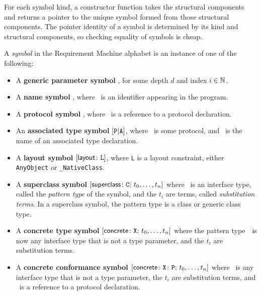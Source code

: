 \documentclass[../generics]{subfiles}
\begin{document}
For each symbol kind, a constructor function takes the structural components and returns a pointer to the unique symbol formed from those structural components. The pointer identity of a symbol is determined by its kind and structural components, so checking equality of symbols is cheap.
\begin{definition}\label{rqm symbol def}
A \emph{symbol} in the Requirement Machine alphabet is an instance of one of the following:
\begin{itemize}
\item A \textbf{generic parameter symbol} , for some depth $d$ and index $i\in\mathbb{N}$.
\item A \textbf{name symbol} \nA, where \nA\ is an identifier appearing in the program.
\item A \textbf{protocol symbol} \pP, where \tP\ is a reference to a protocol declaration.
\item An \textbf{associated type symbol} $[\texttt{P}|\texttt{A}]$, where \tP\ is some protocol, and \nA\ is the name of an associated type declaration.
\item A \textbf{layout symbol} $[\mathsf{layout}\colon\texttt{L}]$, where \texttt{L} is a layout constraint, either \texttt{AnyObject} or \verb|_NativeClass|.
\item A \textbf{superclass symbol} $[\mathsf{superclass}\colon \texttt{C};\,t_0,\ldots,t_n]$ where \tC\ is an interface type, called the \emph{pattern type} of the symbol, and the $t_i$ are terms, called \emph{substitution terms}. In a superclass symbol, the pattern type is a class or generic class type.
\item A \textbf{concrete type symbol} $[\mathsf{concrete}\colon \texttt{X};\,t_0,\ldots,t_n]$ where the pattern type~\tX\ is now any interface type that is not a type parameter, and the $t_i$ are substitution terms.
\item A \textbf{concrete conformance symbol} $[\mathsf{concrete}\colon \texttt{X}\colon\texttt{P};\,t_0,\ldots,t_n]$ where \tX\ is any interface type that is not a type parameter, the $t_i$ are substitution terms, and \tP\ is a reference to a protocol declaration.
\end{itemize}
\end{definition}
\end{document}
